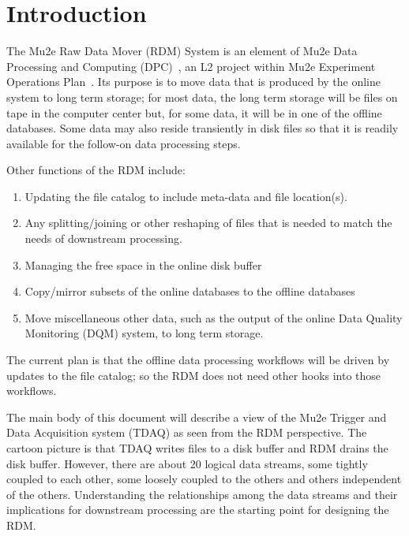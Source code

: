 \chapter{Introduction}

\label{ch:intro}

The Mu2e Raw Data Mover (RDM) System is an element of Mu2e Data Processing
and Computing (DPC)~\cite{DPC}, an L2 project within Mu2e Experiment Operations Plan~\cite{PEOP}.
Its purpose is to move data
that is produced by the online system to long term storage;
for most data, the long term storage will be files on tape in the computer center
but, for some data, it will be in one of the offline databases.
Some data may also reside transiently in disk files so that
it is readily available for the follow-on data processing steps.

Other functions of the RDM include:
\begin{enumerate}
\item Updating the file catalog to include meta-data and file location(s).
\item Any splitting/joining or other reshaping of files that is needed to match the needs of downstream processing.
\item Managing the free space in the online disk buffer
\item Copy/mirror subsets of the online databases to the offline databases
\item Move miscellaneous other data, such as the output of the online Data Quality Monitoring (DQM) system, to long term storage.
\end{enumerate}

The current plan is that the offline data processing workflows will be driven by updates to the file catalog;
so the RDM does not need other hooks into those workflows.



The main body of this document will describe a view of the
Mu2e Trigger and Data Acquisition system (TDAQ) as seen from the RDM perspective.
The cartoon picture is that TDAQ writes files to a disk buffer and RDM drains the disk buffer.
However, there are about 20 logical data streams, some tightly coupled to each
other, some loosely coupled to the others and others independent of the others.
Understanding the relationships among the data streams and their implications
for downstream processing are the starting point for designing the RDM.

